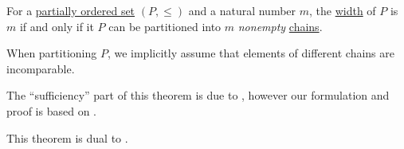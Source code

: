 \begin{theorem}\label{thm:dilworths_theorem}
  For a \hyperref[def:partially_ordered_set]{partially ordered set} \( (P, \leq) \) and a natural number \( m \), the \hyperref[def:partial_order_connectedness/width]{width} of \( P \) is \( m \) if and only if it \( P \) can be partitioned into \( m \) \emph{nonempty} \hyperref[def:partial_order_connectedness/chain]{chains}.
\end{theorem}
\begin{comments}
  \item When partitioning \( P \), we implicitly assume that elements of different chains are incomparable.
  \item The \enquote{sufficiency} part of this theorem is due to \textcite{Dilworth1950DecompositionTheorem}, however our formulation and proof is based on \textcite[\S 2.5]{Harzheim2005OrderedSets}.
  \item This theorem is dual to .
\end{comments}
